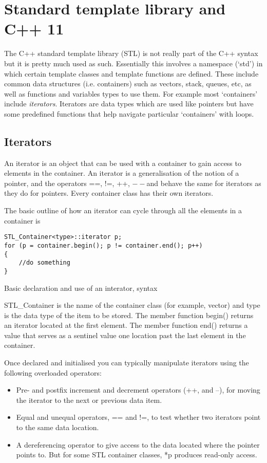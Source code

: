 \section{Standard template library and C++ 11}

The C++ standard template library (STL) is not really part of the C++ syntax but it is pretty much used
as such. Essentially this involves a namespace (`std') in which certain template classes and template
functions are defined. These include common data structures (i.e. containers) such as vectors, stack,
queues, etc, as well as functions and variables types to use them. For example most `containers' include
\emph{iterators}. Iterators are data types which are used like pointers but have some predefined
functions that help navigate particular `containers' with loops.

\subsection{Iterators}
An iterator is an object that can be used with a container to gain access to elements in the container. An
iterator is a generalisation of the notion of a pointer, and the operators ==, !=, ++, $--$and behave the same
for iterators as they do for pointers. Every container class has their own iterators.

The basic outline of how an iterator can cycle through all the elements in a container is
\begin{listing}[H]
\begin{verbatim}
STL_Container<type>::iterator p;
for (p = container.begin(); p != container.end(); p++)
{
	//do something
}
\end{verbatim}
\caption{Basic declaration and use of an interator, syntax}
\label{source_code_1}
\end{listing}

STL\_Container is the name of the container class (for example, vector) and type is the data type of the item
to be stored. The member function begin() returns an iterator located at the first element. The member
function end() returns a value that serves as a sentinel value one location past the last element in the container.

Once declared and initialised you can typically manipulate iterators using the following overloaded operators:
\begin{itemize}
	\item Pre- and postfix increment and decrement operators (++, and --), for moving the iterator to the
	next or previous data item.
	\item Equal and unequal operators, == and !=, to test whether two iterators point to the same data
	location.
	\item A dereferencing operator to give access to the data located where the pointer points to.
	But for some STL container classes, *p produces read-only access.
\end{itemize}

